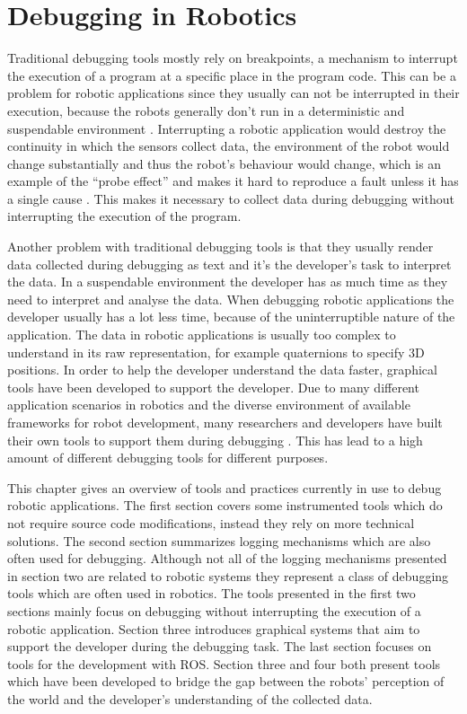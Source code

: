 \chapter{Debugging in Robotics}


Traditional debugging tools mostly rely on breakpoints, a mechanism to interrupt the execution of a program at a specific place in the program code. This can be a problem for robotic applications since they usually can not be interrupted in their execution, because the robots generally don't run in a deterministic and suspendable environment \cite{Gumbley2009}. Interrupting a robotic application would destroy the continuity in which the sensors collect data, the environment of the robot would change substantially and thus the robot's behaviour would change, which is an example of the ``probe effect'' and makes it hard to reproduce a fault unless it has a single cause \cite{Gumbley2009}. This makes it necessary to collect data during debugging without interrupting the execution of the program.

Another problem with traditional debugging tools is that they usually render data collected during debugging as text and it's the developer's task to interpret the data. In a suspendable environment the developer has as much time as they need to interpret and analyse the data. When debugging robotic applications the developer usually has a lot less time, because of the uninterruptible nature of the application. The data in robotic applications is usually too complex to understand in its raw representation, for example quaternions to specify 3D positions. In order to help the developer understand the data faster, graphical tools have been developed to support the developer. Due to many different application scenarios in robotics and the diverse environment of available frameworks for robot development, many researchers and developers have built their own tools to support them during debugging \cite{Collett2010}. This has lead to a high amount of different debugging tools for different purposes.

This chapter gives an overview of tools and practices currently in use to debug robotic applications. The first section covers some instrumented tools which do not require source code modifications, instead they rely on more technical solutions. The second section summarizes logging mechanisms which are also often used for debugging. Although not all of the logging mechanisms presented in section two are related to robotic systems they represent a class of debugging tools which are often used in robotics. The tools presented in the first two sections mainly focus on debugging without interrupting the execution of a robotic application. Section three introduces graphical systems that aim to support the developer during the debugging task. The last section focuses on tools for the development with ROS. Section three and four both present tools which have been developed to bridge the gap between the robots' perception of the world and the developer's understanding of the collected data.

